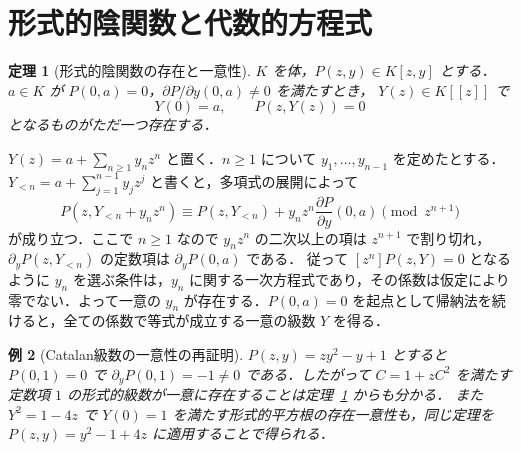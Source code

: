 \documentclass[a5paper,10pt,onecolumn]{jsarticle}
\makeatletter
\theoremstyle{mathnotetheorem}
\newtheorem{theorem}{定理}[section]
\newtheorem{example}[theorem]{例}
\renewcommand{\proofname}{証明}
\renewenvironment{proof}[1][\proofname]{%
  \par\pushQED{\qed}\normalfont\topsep4\p@\@plus2\p@\relax
  \trivlist\item[\hskip\labelsep\bfseries #1]\ignorespaces
}{\popQED\endtrivlist\@endpefalse}
\makeatother
\begin{document}
\section{形式的陰関数と代数的方程式}
\begin{theorem}[形式的陰関数の存在と一意性]\label{thm:implicit}
$K$ を体，$P(z,y)\in K[z,y]$ とする．$a\in K$ が
$P(0,a)=0$，$\partial P/\partial y(0,a)\ne0$ を満たすとき，
$Y(z)\in K[[z]]$ で
\[
 Y(0)=a,\qquad P(z,Y(z))=0
\]
となるものがただ一つ存在する．
\end{theorem}
\begin{proof}
$Y(z)=a+\sum_{n\ge1}y_nz^n$ と置く．$n\ge1$ について $y_1,\dots,y_{n-1}$ を定めたとする．$Y_{<n}=a+\sum_{j=1}^{n-1}y_jz^j$ と書くと，多項式の展開によって
\[
 P(z,Y_{<n}+y_nz^n)
 \equiv P(z,Y_{<n})
 +y_nz^n\frac{\partial P}{\partial y}(0,a)
 \pmod{z^{n+1}}
\]
が成り立つ．ここで $n\ge1$ なので $y_nz^n$ の二次以上の項は $z^{n+1}$ で割り切れ，$\partial_yP(z,Y_{<n})$ の定数項は $\partial_yP(0,a)$ である．
従って $[z^n]P(z,Y)=0$ となるように $y_n$ を選ぶ条件は，$y_n$ に関する一次方程式であり，その係数は仮定により零でない．よって一意の $y_n$ が存在する．$P(0,a)=0$ を起点として帰納法を続けると，全ての係数で等式が成立する一意の級数 $Y$ を得る．
\end{proof}
\begin{example}[Catalan級数の一意性の再証明]
$P(z,y)=zy^2-y+1$ とすると $P(0,1)=0$ で
$\partial_yP(0,1)=-1\ne0$ である．したがって
$C=1+zC^2$ を満たす定数項 $1$ の形式的級数が一意に存在することは定理~\ref{thm:implicit} からも分かる．
また $Y^2=1-4z$ で $Y(0)=1$ を満たす形式的平方根の存在一意性も，同じ定理を $P(z,y)=y^2-1+4z$ に適用することで得られる．
\end{example}
\end{document}
